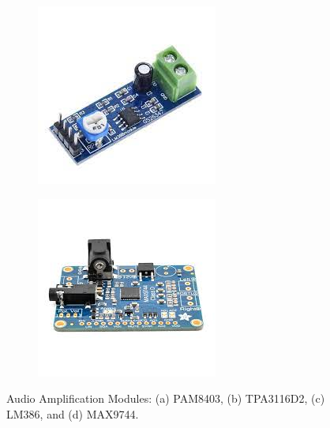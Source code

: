 \begin{figure}[h!]
\begin{subfigure}[b]{0.22\textwidth}
		\includegraphics[width=\textwidth]{assets/ch2/LM386}
		\caption{}
		\label{fig:lm386}
	\end{subfigure}
	\hfill
	\begin{subfigure}[b]{0.22\textwidth}
		\centering
		\includegraphics[width=\textwidth]{assets/ch2/MAX9744}
		\caption{}
		\label{fig:max9744}
	\end{subfigure}
	\caption{Audio Amplification Modules: (a) PAM8403, (b) TPA3116D2, (c) LM386, and (d) MAX9744.}
	\label{fig:audio_modules}
\end{figure}

